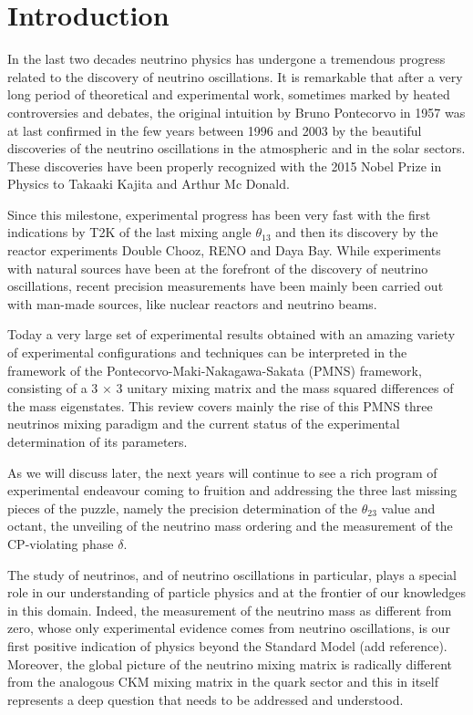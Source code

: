 \section{Introduction}
\label{sec:intro}

In the last two decades neutrino physics has undergone a tremendous progress related to the discovery of neutrino oscillations. It is remarkable that after a very long period of theoretical and experimental work, sometimes marked by heated controversies and debates, the original intuition by Bruno Pontecorvo in 1957 \cite{pontecorvo1, pontecorvo2} was at last confirmed in the few years between 1996 and 2003 by the beautiful discoveries of the neutrino oscillations in the atmospheric and in the solar sectors. These discoveries have been properly recognized with the 2015 Nobel Prize in Physics to Takaaki Kajita and Arthur Mc Donald.

Since this milestone, experimental progress has been very fast with the first indications by T2K\cite{t2k2011} of the last mixing angle $\theta_{13}$ and then its discovery by the reactor experiments Double Chooz, RENO and Daya Bay. While experiments with natural sources have been at the forefront of the discovery of neutrino oscillations, recent precision measurements have been mainly been carried out with man-made sources, like nuclear reactors and neutrino beams. 

Today a very large set of experimental results obtained with an amazing variety of experimental configurations and techniques can be interpreted in the framework of the Pontecorvo-Maki-Nakagawa-Sakata (PMNS) framework, consisting of a 3 $\times$ 3 unitary mixing matrix and the mass squared differences of the mass eigenstates. This review covers mainly the rise of this PMNS three neutrinos mixing paradigm and the current status of the experimental determination of its parameters.

As we will discuss later, the next years will continue to see a rich program of experimental endeavour coming to fruition and addressing the three last missing pieces of the puzzle, namely the precision determination of the $\theta_{23}$ value and octant, the unveiling of the neutrino mass ordering and the measurement of the CP-violating phase $\delta$.

The study of neutrinos, and of neutrino oscillations in particular, plays a special role in our understanding of particle physics and at the frontier of our knowledges in this domain. Indeed, the measurement of the neutrino mass as different from zero, whose only experimental evidence comes from neutrino oscillations, is our first positive indication of physics beyond the Standard Model (add reference). Moreover, the global picture of the neutrino mixing matrix is radically different from the analogous CKM mixing matrix in the quark sector and this in itself represents a deep question that needs to be addressed and understood.

